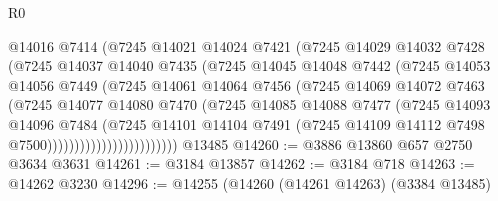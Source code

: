 \begin{lexlean}{R0}
\begin{coremodule}
                            @14016
                            @7414
                            (@7245
                              @14021
                              @14024
                              @7421
                              (@7245
                                @14029
                                @14032
                                @7428
                                (@7245
                                  @14037
                                  @14040
                                  @7435
                                  (@7245
                                    @14045
                                    @14048
                                    @7442
                                    (@7245
                                      @14053
                                      @14056
                                      @7449
                                      (@7245
                                        @14061
                                        @14064
                                        @7456
                                        (@7245
                                          @14069
                                          @14072
                                          @7463
                                          (@7245
                                            @14077
                                            @14080
                                            @7470
                                            (@7245
                                              @14085
                                              @14088
                                              @7477
                                              (@7245
                                                @14093
                                                @14096
                                                @7484
                                                (@7245
                                                  @14101
                                                  @14104
                                                  @7491
                                                  (@7245
                                                    @14109
                                                    @14112
                                                    @7498
                                                    @7500))))))))))))))))))))))))
    @13485
@14260 := @3886 @13860 @657 @2750 @3634 @3631
@14261 := @3184 @13857
@14262 := @3184 @718
@14263 := @14262 @3230
@14296 := @14255
    (@14260
      (@14261 @14263)
      (@3384 @13485)

\end{coremodule}
\end{lexlean}
